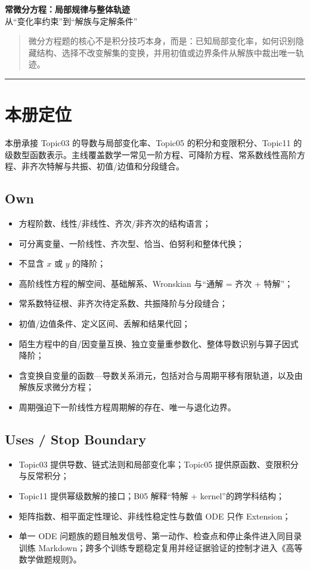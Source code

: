 \documentclass[11pt,a4paper,fontset=fandol]{ctexart}
\begin{document}
\begin{center}
{\LARGE\textbf{常微分方程：局部规律与整体轨迹}}\\[0.4em]
{\large 从“变化率约束”到“解族与定解条件”}
\end{center}
\vspace{0.4em}
\begin{quote}
微分方程题的核心不是积分技巧本身，而是：已知局部变化率，如何识别隐藏结构、选择不改变解集的变换，并用初值或边界条件从解族中裁出唯一轨迹。
\end{quote}
\begin{center}\rule{0.5\linewidth}{0.5pt}\end{center}

\setcounter{section}{-1}
\section{本册定位}
本册承接 Topic03 的导数与局部变化率、Topic05 的积分和变限积分、Topic11 的级数型函数表示。主线覆盖数学一常见一阶方程、可降阶方程、常系数线性高阶方程、非齐次特解与共振、初值/边值和分段缝合。

\subsection{Own}
\begin{itemize}
  \item 方程阶数、线性/非线性、齐次/非齐次的结构语言；
  \item 可分离变量、一阶线性、齐次型、恰当、伯努利和整体代换；
  \item 不显含 $x$ 或 $y$ 的降阶；
  \item 高阶线性方程的解空间、基础解系、Wronskian 与“通解 = 齐次 + 特解”；
  \item 常系数特征根、非齐次待定系数、共振降阶与分段缝合；
  \item 初值/边值条件、定义区间、丢解和结果代回；
  \item 陌生方程中的自/因变量互换、独立变量重参数化、整体导数识别与算子因式降阶；
  \item 含变换自变量的函数—导数关系消元，包括对合与周期平移有限轨道，以及由解族反求微分方程；
  \item 周期强迫下一阶线性方程周期解的存在、唯一与退化边界。
\end{itemize}

\subsection{Uses / Stop Boundary}
\begin{itemize}
  \item Topic03 提供导数、链式法则和局部变化率；Topic05 提供原函数、变限积分与反常积分；
  \item Topic11 提供幂级数解的接口；B05 解释“特解 + kernel”的跨学科结构；
  \item 矩阵指数、相平面定性理论、非线性稳定性与数值 ODE 只作 Extension；
  \item 单一 ODE 问题族的题目触发信号、第一动作、检查点和停止条件进入同目录训练 Markdown；跨多个训练专题稳定复用并经证据验证的控制才进入《高等数学做题规则》。
\end{itemize}
\end{document}
